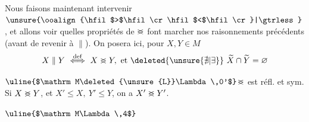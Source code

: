 Nous faisons maintenant intervenir $\unsure{\ooalign{\hfil$>$\hfil\cr\hfil$<$\hfil\cr}|\gtrless}$, et allons voir quelles propriétés de $\ooalign{\hfil$>$\hfil\cr\hfil$<$\hfil\cr}$ font marcher nos raisonnements précédents (avant de  revenir à $\parallel$). On posera ici, pour $X,Y\in M$
\[
 X\parallel Y\ \overset{\mathrm{def}}{\Longleftrightarrow}\ X\mathrel{\ooalign{\hfil$>$\hfil\cr\hfil$<$\hfil\cr}}Y,\ \text{et }\deleted{\unsure{\nexists|\exists}}\ \widetilde X\cap\widetilde Y=\varnothing
\]

$\text{\uline{$\mathrm M\deleted{\unsure{L}}\Lambda\,0'$}}$\quad $\ooalign{\hfil$>$\hfil\cr\hfil$<$\hfil\cr}$ est réfl. et sym. Si $X\mathrel{\ooalign{\hfil$>$\hfil\cr\hfil$<$\hfil\cr}}Y$, et $X'\leq X,\ Y'\leq Y$, on a $X'\mathrel{\ooalign{\hfil$>$\hfil\cr\hfil$<$\hfil\cr}}Y'$.

$\text{\uline{$\mathrm M\Lambda\,4$}}$\quad {}
